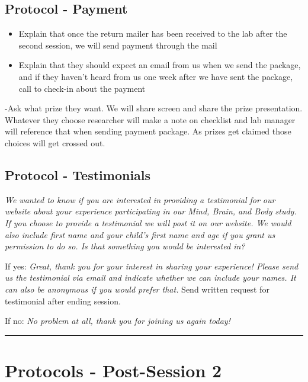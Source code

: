 \documentclass[]{book}
\begin{document}
\hypertarget{protocol---payment-5}{%
\subsection{Protocol - Payment}\label{protocol---payment-5}}

\begin{itemize}
\item
  Explain that once the return mailer has been received to the lab after the second session, we will send payment through the mail
\item
  Explain that they should expect an email from us when we send the package, and if they haven't heard from us one week after we have sent the package, call to check-in about the payment
\end{itemize}

-Ask what prize they want. We will share screen and share the prize presentation. Whatever they choose researcher will make a note on checklist and lab manager will reference that when sending payment package. As prizes get claimed those choices will get crossed out.

\hypertarget{protocol---testimonials-3}{%
\subsection{Protocol - Testimonials}\label{protocol---testimonials-3}}

\emph{We wanted to know if you are interested in providing a testimonial for our website about your experience participating in our Mind, Brain, and Body study. If you choose to provide a testimonial we will post it on our website. We would also include first name and your child's first name and age if you grant us permission to do so. Is that something you would be interested in?}

If yes: \emph{Great, thank you for your interest in sharing your experience! Please send us the testimonial via email and indicate whether we can include your names. It can also be anonymous if you would prefer that.} Send written request for testimonial after ending session.

If no: \emph{No problem at all, thank you for joining us again today!}

\begin{center}\rule{0.5\linewidth}{0.5pt}\end{center}

\hypertarget{protocols---post-session-2-2}{%
\section{Protocols - Post-Session 2}\label{protocols---post-session-2-2}}
\end{document}
